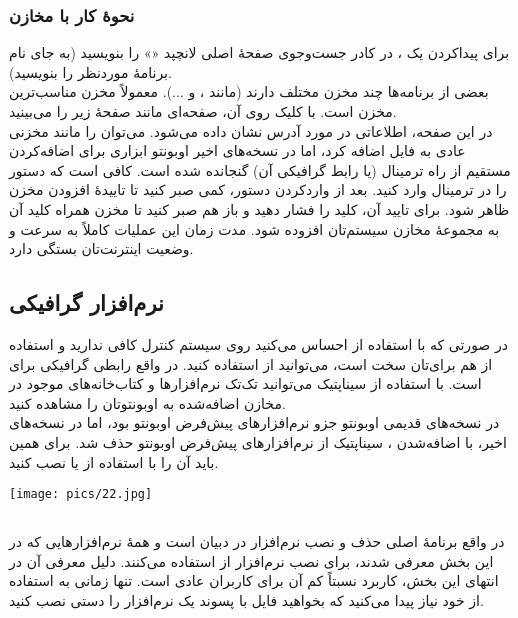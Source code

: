 \subsubsection[نحوهٔ کار با مخازن ppa]{نحوهٔ کار با مخازن }
برای پیداکردن یک ، در کادر جست‌وجوی صفحهٔ اصلی لانچپد «» را بنویسید (به جای  نام برنامهٔ موردنظر را بنویسید).\\
بعضی از برنامه‌ها چند مخزن مختلف دارند (مانند ،  و ...). معمولاً مخزن  مناسب‌ترین مخزن است. با کلیک روی آن، صفحه‌ای مانند صفحهٔ زیر را می‌بینید.\\
در این صفحه، اطلاعاتی در مورد آدرس  نشان داده می‌شود. می‌توان  را مانند مخزنی عادی به فایل  اضافه کرد، اما در نسخه‌های اخیر اوبونتو ابزاری برای اضافه‌کردن مستقیم  از راه ترمینال (یا رابط گرافیکی آن) گنجانده شده است. کافی است که دستور  را در ترمینال وارد کنید. بعد از واردکردن دستور، کمی صبر کنید تا تاییدهٔ افزودن مخزن ظاهر شود. برای تایید آن، کلید  را فشار دهید و باز هم صبر کنید تا مخزن همراه کلید آن به مجموعهٔ مخازن سیستم‌تان افزوده شود. مدت زمان این عملیات کاملاً به سرعت و وضعیت اینترنت‌تان بستگی دارد.

\subsection[نرم‌افزار گرافیکی Synaptic]{نرم‌افزار گرافیکی }
در صورتی که با استفاده از  احساس می‌کنید روی سیستم کنترل کافی ندارید و استفاده از  هم برای‌تان سخت است، می‌توانید از  استفاده کنید.  در واقع رابطی گرافیکی برای  است. با استفاده از سیناپتیک می‌توانید تک‌تک نرم‌افزارها و کتاب‌خانه‌های موجود در مخازن اضافه‌شده به اوبونتوتان را مشاهده کنید.\\
 در نسخه‌های قدیمی اوبونتو جزو نرم‌افزارهای پیش‌فرض اوبونتو بود، اما در نسخه‌های اخیر، با اضافه‌شدن ، سیناپتیک از نرم‌افزارهای پیش‌فرض اوبونتو حذف شد. برای همین باید آن را با استفاده از  یا  نصب کنید.

\begin{center}
\texttt{[image: pics/22.jpg]}
\end{center}


\subsection[dpkg]{}
 در واقع برنامهٔ اصلی حذف و نصب نرم‌افزار در دبیان است و همهٔ نرم‌افزارهایی که در این بخش معرفی شدند، برای نصب نرم‌افزار از  استفاده می‌کنند. دلیل معرفی آن در انتهای این بخش، کاربرد نسبتاً کم آن برای کاربران عادی است. تنها زمانی به استفاده از خود  نیاز پیدا می‌کنید که بخواهید فایل با پسوند  یک نرم‌افزار را دستی نصب کنید.\\

